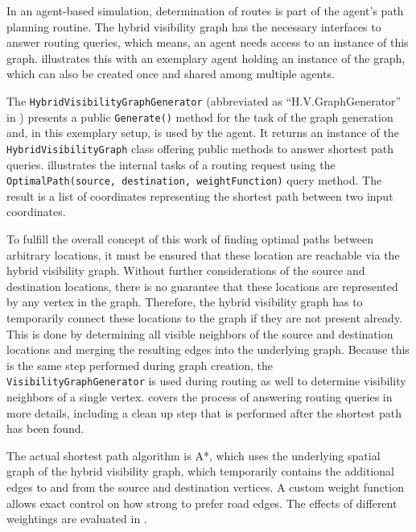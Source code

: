 	In an agent-based simulation, determination of routes is part of the agent's path planning routine.
	The hybrid visibility graph has the necessary interfaces to answer routing queries, which means, an agent needs access to an instance of this graph.
	 illustrates this with an exemplary agent holding an instance of the graph, which can also be created once and shared among multiple agents.
	
	The \texttt{HybridVisibilityGraphGenerator} (abbreviated as \enquote{H.V.GraphGenerator} in ) presents a public \texttt{Generate()} method for the task of the graph generation and, in this exemplary setup, is used by the agent.
	It returns an instance of the \texttt{HybridVisibilityGraph} class offering public methods to answer shortest path queries.
	 illustrates the internal tasks of a routing request using the \texttt{OptimalPath(source, destination, weightFunction)} query method.
	The result is a list of coordinates representing the shortest path between two input coordinates.
	
	To fulfill the overall concept of this work of finding optimal paths between arbitrary locations, it must be ensured that these location are reachable via the hybrid visibility graph.
	Without further considerations of the source and destination locations, there is no guarantee that these locations are represented by any vertex in the graph.
	Therefore, the hybrid visibility graph has to temporarily connect these locations to the graph if they are not present already.
	This is done by determining all visible neighbors of the source and destination locations and merging the resulting edges into the underlying graph.
	Because this is the same step performed during graph creation, the \texttt{VisibilityGraphGenerator} is used during routing as well to determine visibility neighbors of a single vertex.
	 covers the process of answering routing queries in more details, including a clean up step that is performed after the shortest path has been found.
	
	The actual shortest path algorithm is A*, which uses the underlying spatial graph of the hybrid visibility graph, which temporarily contains the additional edges to and from the source and destination vertices.
	A custom weight function allows exact control on how strong to prefer road edges.
	The effects of different weightings are evaluated in .

